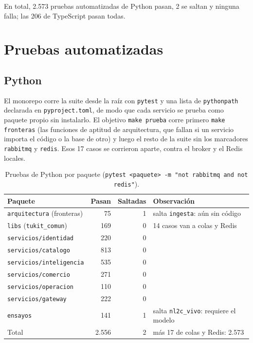 \documentclass[11pt,letterpaper]{article}
\newcommand{\ruta}[1]{\texttt{\small #1}}
\begin{document}
En total, 2.573 pruebas automatizadas de Python pasan, 2 se saltan y ninguna falla; las 206 de TypeScript
pasan todas.

\section{Pruebas automatizadas}

\subsection{Python}

El monorepo corre la suite desde la raíz con \ruta{pytest} y una lista de \ruta{pythonpath} declarada en
\ruta{pyproject.toml}, de modo que cada servicio se prueba como paquete propio sin instalarlo. El objetivo
\ruta{make prueba} corre primero \ruta{make fronteras} (las funciones de aptitud de arquitectura, que fallan
si un servicio importa el código o la base de otro) y luego el resto de la suite sin los marcadores
\ruta{rabbitmq} y \ruta{redis}. Esos 17 casos se corrieron aparte, contra el broker y el Redis locales.

\begin{table}[h]
\centering\small
\caption{Pruebas de Python por paquete (\ruta{pytest <paquete> -m "not rabbitmq and not redis"}).}
\begin{tabular}{lrrl}
\toprule
Paquete & Pasan & Saltadas & Observación \\
\midrule
\ruta{arquitectura} (fronteras) & 75 & 1 & salta \ruta{ingesta}: aún sin código \\
\ruta{libs} (\ruta{tukit\_\allowbreak{}comun}) & 169 & 0 & 14 casos van a colas y Redis \\
\ruta{servicios/\allowbreak{}identidad} & 220 & 0 & \\
\ruta{servicios/\allowbreak{}catalogo} & 813 & 0 & \\
\ruta{servicios/\allowbreak{}inteligencia} & 535 & 0 & \\
\ruta{servicios/\allowbreak{}comercio} & 271 & 0 & \\
\ruta{servicios/\allowbreak{}operacion} & 110 & 0 & \\
\ruta{servicios/\allowbreak{}gateway} & 222 & 0 & \\
\ruta{ensayos} & 141 & 1 & salta \ruta{nl2c\_\allowbreak{}vivo}: requiere el modelo \\
\midrule
Total & 2.556 & 2 & más 17 de colas y Redis: 2.573 \\
\bottomrule
\end{tabular}
\end{table}
\end{document}
